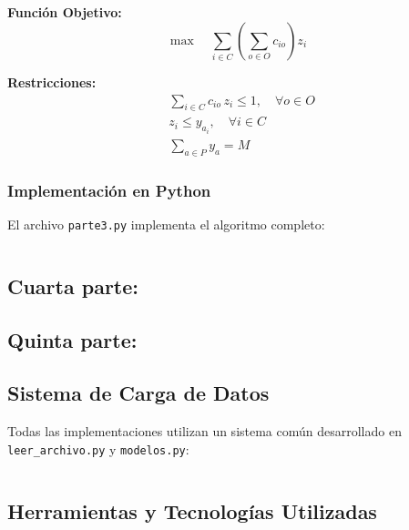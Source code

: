 \documentclass[a4paper,12pt]{article}
\begin{document}
\textbf{Función Objetivo:}
\begin{equation}
\max \quad \sum_{i \in C} \left(\sum_{o \in O} c_{io}\right) z_i
\end{equation}

\textbf{Restricciones:}
\begin{align}
&\sum_{i \in C} c_{io} \, z_i \leq 1, \quad \forall o \in O \\
&z_i \leq y_{a_i}, \quad \forall i \in C \\
&\sum_{a \in P} y_a = M
\end{align}


\subsubsection{Implementación en Python}

El archivo \texttt{parte3.py} implementa el algoritmo completo:

\begin{lstlisting}[language=Python, caption=Algoritmo principal de generación de columnas]

\end{lstlisting}

\subsection{Cuarta parte:}
\label{sec:variante4}

\subsection{Quinta parte:}
\label{sec:variante5}

\subsection{Sistema de Carga de Datos}

Todas las implementaciones utilizan un sistema común desarrollado en \texttt{leer\_archivo.py} y \texttt{modelos.py}:

\begin{lstlisting}[language=Python, caption=Sistema de carga de datos]

\end{lstlisting}

\subsection{Herramientas y Tecnologías Utilizadas}
\end{document}
